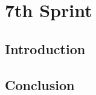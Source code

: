 \graphicspath{{./assets/}}
\setcounter{mtc}{5}
\chapter{ 7th Sprint}

\minitoc
\newpage
\section*{Introduction}



\section*{Conclusion}

